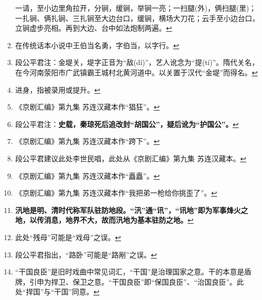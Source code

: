 \begin{enumerate}
  一请，至小边里角拉开，分锏，缓锏，举锏一亮；一扫腿(外)，俩扫腿(里)；一扎锏、俩扎锏、三扎锏至大边台口，缓锏，横场大刀花；云手至小边台口，立锏虚步亮相。再到大边、台中如法炮制两遍。\protect\hyperlink{fnref323}{↩}
\item
  \leavevmode\hypertarget{fn324}{}%
  在传统话本小说中王伯当名勇，字伯当，以字行。\protect\hyperlink{fnref324}{↩}
\item
  \leavevmode\hypertarget{fn325}{}%
  段公平君注：金堤关，堤字正音为``敌(dí)''，艺人讹念为``提(tí)''。隋代关名，在今河南荥阳市广武镇霸王城村北黄河道中。以关置于汉代``金堤''而得名。\protect\hyperlink{fnref325}{↩}
\item
  \leavevmode\hypertarget{fn326}{}%
  进身，指被录用或提升。\protect\hyperlink{fnref326}{↩}
\item
  \leavevmode\hypertarget{fn327}{}%
  《京剧汇编》第九集
  苏连汉藏本作``猖狂''。\protect\hyperlink{fnref327}{↩}
\item
  \leavevmode\hypertarget{fn328}{}%
  段公平君注：\textbf{史载，秦琼死后追改封``胡国公''，疑后讹为``护国公''。}\protect\hyperlink{fnref328}{↩}
\item
  \leavevmode\hypertarget{fn329}{}%
  《京剧汇编》第九集
  苏连汉藏本作``跨下''。\protect\hyperlink{fnref329}{↩}
\item
  \leavevmode\hypertarget{fn330}{}%
  段公平君建议此处李世民唱，此处从《京剧汇编》第九集
  苏连汉藏本。\protect\hyperlink{fnref330}{↩}
\item
  \leavevmode\hypertarget{fn331}{}%
  《京剧汇编》第九集
  苏连汉藏本作``矗矗''。\protect\hyperlink{fnref331}{↩}
\item
  \leavevmode\hypertarget{fn332}{}%
  《京剧汇编》第九集
  苏连汉藏本作``我把弟一枪给你挑歪了''。\protect\hyperlink{fnref332}{↩}
\item
  \leavevmode\hypertarget{fn333}{}%
  \textbf{汛地是明、清时代称军队驻防地段。``汛''通``讯''，``讯地''即为军事烽火之地，以传消息，地界不大，故而汛地为基本驻防之地。}\protect\hyperlink{fnref333}{↩}
\item
  \leavevmode\hypertarget{fn334}{}%
  此处``残母''可能是``戏母''之误。\protect\hyperlink{fnref334}{↩}
\item
  \leavevmode\hypertarget{fn335}{}%
  段公平君指出，``路卧''可能是``路剐''之误。\protect\hyperlink{fnref335}{↩}
\item
  \leavevmode\hypertarget{fn336}{}%
  ``干国良臣''是旧时戏曲中常见词汇，``干国''是治理国家之意。干的本意是盾牌，引申为捍卫、保卫之意。``干国良臣''即``保国良臣''、``治国良臣''。此处``捍国''与``干国''同意。\protect\hyperlink{fnref336}{↩}

\end{enumerate}
